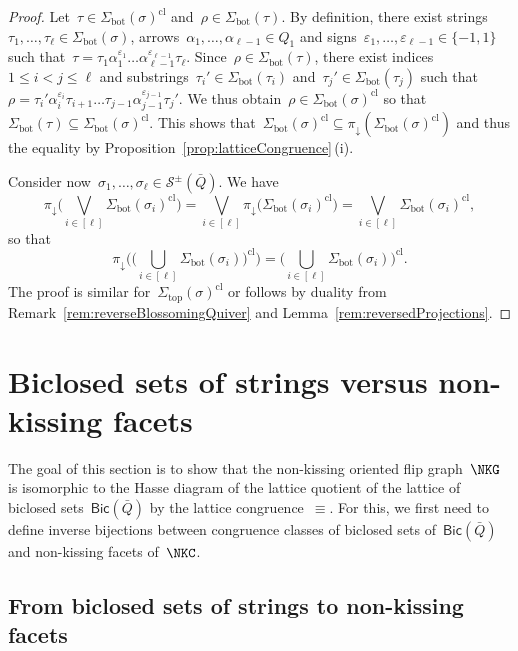\documentclass{amsart}
\theoremstyle{definition}
\newcommand{\strings}{\mathcal{S}} %
\renewcommand{\top}{\mathrm{top}} %
\newcommand{\bottom}{\mathrm{bot}} %
\newcommand{\bigJoin}{\bigvee} %
\newcommand{\closure}[1]{#1^{\mathrm{cl}}} %
\newcommand{\Bicl}[1]{\mathsf{Bic}(#1)} %
\newcommand{\projDown}{\pi_\downarrow} %
\begin{document}
\begin{proof}
Let~$\tau \in \closure{\Sigma_\bottom(\sigma)}$ and~$\rho \in \Sigma_\bottom(\tau)$.
By definition, there exist strings~${\tau_1, \dots, \tau_\ell \in \Sigma_\bottom(\sigma)}$, arrows~$\alpha_1, \dots, \alpha_{\ell-1} \in Q_1$ and signs~$\varepsilon_1, \dots, \varepsilon_{\ell-1} \in \{-1,1\}$ such that~$\tau = \tau_1 \alpha_1^{\varepsilon_1} \dots \alpha_{\ell-1}^{\varepsilon_{\ell-1}} \tau_\ell$.
Since~${\rho \in \Sigma_\bottom(\tau)}$, there exist indices~$1 \le i < j \le \ell$ and substrings~$\tau_i' \in \Sigma_\bottom(\tau_i)$ and~${\tau_j' \in \Sigma_\bottom(\tau_j)}$ such that ${\rho = \tau_i' \alpha_i^{\varepsilon_i} \tau_{i+1} \dots \tau_{j-1} \alpha_{j-1}^{\varepsilon_{j-1}} \tau_j'}$.
We thus obtain~$\rho \in \closure{\Sigma_\bottom(\sigma)}$ so that~${\Sigma_\bottom(\tau) \subseteq \closure{\Sigma_\bottom(\sigma)}}$.
This shows that~$\closure{\Sigma_\bottom(\sigma)} \subseteq \projDown(\closure{\Sigma_\bottom(\sigma)})$ and thus the equality by Proposition~\ref{prop:latticeCongruence}\,(i).

Consider now~$\sigma_1, \dots, \sigma_\ell \in \strings^\pm(\bar Q)$.
We have
\[
\projDown \bigg( \bigJoin_{i\in [\ell]} \closure{\Sigma_\bottom(\sigma_i)} \bigg) = \bigJoin_{i \in [\ell]} \projDown \big( \closure{\Sigma_\bottom(\sigma_i)} \big) = \bigJoin_{i \in [\ell]} \closure{\Sigma_\bottom(\sigma_i)},
\]
so that
\[
\projDown \bigg( \closure{\Big( \bigcup_{i \in [\ell]} \Sigma_\bottom(\sigma_i) \Big)} \bigg) = \closure{\Big( \bigcup_{i \in [\ell]} \Sigma_\bottom(\sigma_i) \Big)}.
\]
The proof is similar for~$\closure{\Sigma_\top(\sigma)}$ or follows by duality from Remark~\ref{rem:reverseBlossomingQuiver} and Lemma~\ref{rem:reversedProjections}.
\end{proof}

\section{Biclosed sets of strings versus non-kissing facets}
\label{sec:biclosedSetsToNKF}

The goal of this section is to show that the non-kissing oriented flip graph~$\NKG$ is isomorphic to the Hasse diagram of the lattice quotient of the lattice of biclosed sets~$\Bicl{\bar Q}$ by the lattice congruence~$\equiv$.
For this, we first need to define inverse bijections between congruence classes of biclosed sets of~$\Bicl{\bar Q}$ and non-kissing facets of~$\NKC$.

\subsection{From biclosed sets of strings to non-kissing facets}
\end{document}
